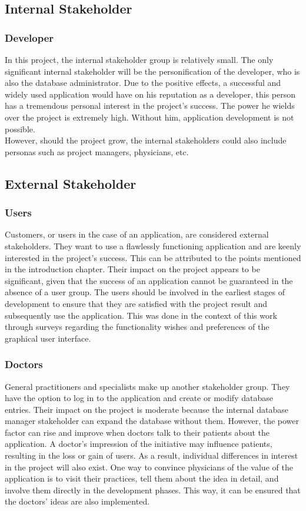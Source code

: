 \subsection{Internal Stakeholder}
\subsubsection{Developer}
In this project, the internal stakeholder group is relatively small. The only significant internal stakeholder will be the personification of the developer, who is also the database administrator. Due to the positive effects, a successful and widely used application would have on his reputation as a developer, this person has a tremendous personal interest in the project's success. The power he wields over the project is extremely high. Without him, application development is not possible.
\newline \\ 
However, should the project grow, the internal stakeholders could also include personas such as project managers, physicians, etc.
\subsection{External Stakeholder}
\subsubsection{Users}
Customers, or users in the case of an application, are considered external stakeholders. They want to use a flawlessly functioning application and are keenly interested in the project's success. This can be attributed to the points mentioned in the introduction chapter. Their impact on the project appears to be significant, given that the success of an application cannot be guaranteed in the absence of a user group.
The users should be involved in the earliest stages of development to ensure that they are satisfied with the project result and subsequently use the application. This was done in the context of this work through surveys regarding the functionality wishes and preferences of the graphical user interface.

\subsubsection{Doctors}
General practitioners and specialists make up another stakeholder group. They have the option to log in to the application and create or modify database entries. Their impact on the project is moderate because the internal database manager stakeholder can expand the database without them. However, the power factor can rise and improve when doctors talk to their patients about the application. A doctor's impression of the initiative may influence patients, resulting in the loss or gain of users. As a result, individual differences in interest in the project will also exist. One way to convince physicians of the value of the application is to visit their practices, tell them about the idea in detail, and involve them directly in the development phases. This way, it can be ensured that the doctors' ideas are also implemented.
